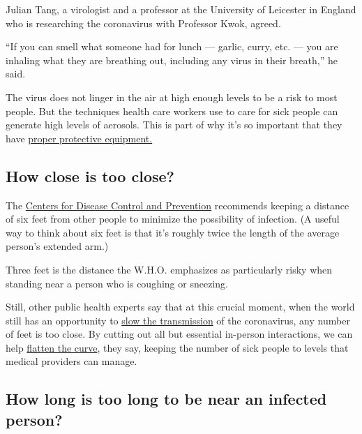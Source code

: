 Julian Tang, a virologist and a professor at the University of Leicester
in England who is researching the coronavirus with Professor Kwok,
agreed.

``If you can smell what someone had for lunch --- garlic, curry, etc.
--- you are inhaling what they are breathing out, including any virus in
their breath,'' he said.

The virus does not linger in the air at high enough levels to be a risk
to most people. But the techniques health care workers use to care for
sick people can generate high levels of aerosols. This is part of why
it's so important that they have
\href{https://www.nytimes.com/interactive/2020/03/11/us/virus-health-workers.html}{proper
protective equipment.}

\hypertarget{how-close-is-too-close}{%
\subsection{How close is too close?}\label{how-close-is-too-close}}

The
\href{https://www.cdc.gov/coronavirus/2019-ncov/hcp/clinical-criteria.html}{Centers
for Disease Control and Prevention} recommends keeping a distance of six
feet from other people to minimize the possibility of infection. (A
useful way to think about six feet is that it's roughly twice the length
of the average person's extended arm.)

Three feet is the distance the W.H.O. emphasizes as particularly risky
when standing near a person who is coughing or sneezing.

Still, other public health experts say that at this crucial moment, when
the world still has an opportunity to
\href{https://www.nytimes.com/interactive/2020/03/19/world/coronavirus-flatten-the-curve-countries.html}{slow
the transmission} of the coronavirus, any number of feet is too close.
By cutting out all but essential in-person interactions, we can help
\href{https://www.nytimes.com/2020/03/11/science/coronavirus-curve-mitigation-infection.html}{flatten
the curve}, they say, keeping the number of sick people to levels that
medical providers can manage.

\hypertarget{how-long-is-too-long-to-be-near-an-infected-person}{%
\subsection{How long is too long to be near an infected
person?}\label{how-long-is-too-long-to-be-near-an-infected-person}}

